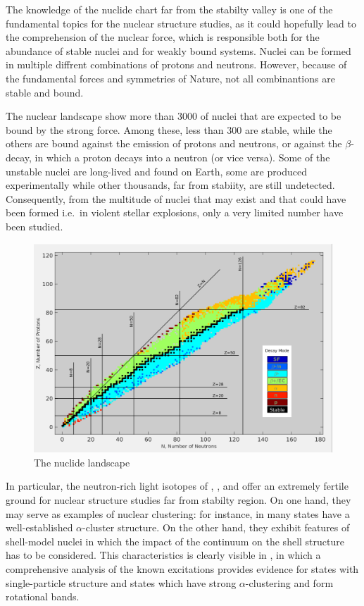 The knowledge of the nuclide chart far from the stabilty valley is one of the
fundamental topics for the nuclear structure studies, as it could hopefully
lead to the comprehension of the nuclear force, which is responsible both for
the abundance of stable nuclei and for weakly bound systems.
Nuclei can be formed in multiple diffrent combinations of protons and neutrons.
However, because of the fundamental forces and symmetries of Nature, not all
combinantions are stable and bound.

\bigbreak

The nuclear landscape show more than $3000$ of nuclei that are expected to be
bound by the strong force. Among these, less than $300$ are stable, while the
others are bound against the emission of protons and neutrons, or against the
$\beta$-decay, in which a proton decays into a neutron (or vice versa). Some
of the unstable nuclei are long-lived and found on Earth, some are produced
experimentally while other thousands, far from stabiity, are still undetected.
Consequently, from the multitude of nuclei that may exist and that could have
been formed i.e.\ in violent stellar explosions, only a very limited number
have been studied.

\bigbreak

\begin{figure}[h]
  \centering
  \includegraphics[scale=.35]{img/DecayModeNuDat2.png}
  \caption{The nuclide landscape}
  \label{nucl}
\end{figure}

\bigbreak

In particular, the neutron-rich light isotopes of , ,  and
 offer an extremely fertile ground for nuclear structure studies far
from stabilty region. On one hand, they may serve as examples of nuclear
clustering: for instance, in  many states have a well-established
$\alpha$-cluster structure. On the other hand, they exhibit features of
shell-model nuclei in which the impact of the continuum on the shell structure
has to be considered. This characteristics is clearly visible in ,
in which a comprehensive analysis of the known excitations provides evidence
for states with single-particle structure and states which have strong
$\alpha$-clustering and form rotational bands.

